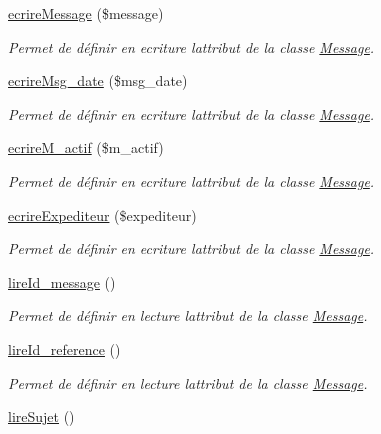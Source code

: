 \begin{DoxyCompactItemize}
\hyperlink{class_message_a1f3fc7d1b51a030c0b52d546cd8a8e5b}{ecrire\+Message} (\$message)
\begin{DoxyCompactList}\small\item\em Permet de définir en ecriture l\textquotesingle{}attribut de la classe \hyperlink{class_message}{Message}. \end{DoxyCompactList}\item 
\hyperlink{class_message_a7536890bce46a2ee4f6927f4d72db97e}{ecrire\+Msg\+\_\+date} (\$msg\+\_\+date)
\begin{DoxyCompactList}\small\item\em Permet de définir en ecriture l\textquotesingle{}attribut de la classe \hyperlink{class_message}{Message}. \end{DoxyCompactList}\item 
\hyperlink{class_message_aeecc4b31c3fa4cbfa690a85bfe1b04d3}{ecrire\+M\+\_\+actif} (\$m\+\_\+actif)
\begin{DoxyCompactList}\small\item\em Permet de définir en ecriture l\textquotesingle{}attribut de la classe \hyperlink{class_message}{Message}. \end{DoxyCompactList}\item 
\hyperlink{class_message_a99962a0640e579ae666d8ea47fafe252}{ecrire\+Expediteur} (\$expediteur)
\begin{DoxyCompactList}\small\item\em Permet de définir en ecriture l\textquotesingle{}attribut de la classe \hyperlink{class_message}{Message}. \end{DoxyCompactList}\item 
\hyperlink{class_message_a3618c4428657046edb1e6634803ea4cd}{lire\+Id\+\_\+message} ()
\begin{DoxyCompactList}\small\item\em Permet de définir en lecture l\textquotesingle{}attribut de la classe \hyperlink{class_message}{Message}. \end{DoxyCompactList}\item 
\hyperlink{class_message_a92dea15765c2e4e8a4da385940a2d9ef}{lire\+Id\+\_\+reference} ()
\begin{DoxyCompactList}\small\item\em Permet de définir en lecture l\textquotesingle{}attribut de la classe \hyperlink{class_message}{Message}. \end{DoxyCompactList}\item 
\hyperlink{class_message_a252f800e40fd051c1ad5b2c0a450f1c2}{lire\+Sujet} ()

\end{DoxyCompactItemize}
